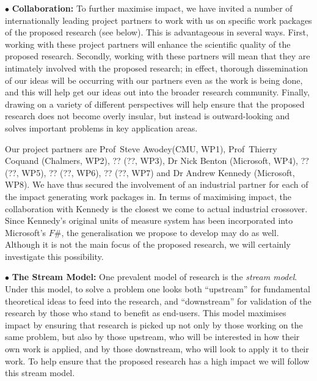 \documentclass[a4paper,11pt]{article}
\begin{document}

\vspace*{0.02in}

$\bullet$ {\bf Collaboration:} To further maximise impact, we have
invited a number of internationally leading project partners to work
with us on specific work packages of the proposed research (see
below). This is advantageous in several ways. First, working
with these project partners will enhance the scientific
quality of the proposed research. Secondly, working with these
partners will mean that they are intimately involved with the proposed
research; in effect, thorough dissemination of our ideas will be
occurring with our partners even as the work is being done, and this
will %
help get our ideas out into the broader
research community. Finally, drawing on a variety of different
perspectives will help ensure that the proposed research does not
become overly insular, but instead is outward-looking and
solves important problems in key application areas.



Our project partners are Prof~Steve Awodey(CMU, WP1), Prof~Thierry
Coquand (Chalmers, WP2), ?? (??, WP3), Dr Nick Benton (Microsoft,
WP4), ?? (??, WP5), ?? (??, WP6), ?? (??, WP7) and Dr Andrew Kennedy
(Microsoft, WP8). We have thus secured the involvement of an
industrial partner for each of the impact generating work packages
in. In terms of maximising impact, the collaboration with Kennedy is
the closest we come to actual industrial crossover. Since Kennedy's
original units of measure system has been incorporated into
Microsoft's $F\#$, the generalisation we propose to develop may do as
well. Although it is not the main focus of the proposed research, we
will certainly investigate this possibility. 



\vspace*{0.02in}

$\bullet$ {\bf The Stream Model:} One prevalent model of research is
the {\em stream model}. Under this model, to solve a problem one looks
both ``upstream'' for fundamental theoretical ideas to feed into the
research, and ``downstream'' for validation of the research by those
who stand to benefit as end-users. This model maximises impact by
ensuring that research is picked up not only by those working on the
same problem, but also by those upstream, who will be interested in
how their own work is applied, and by those downstream, who will look
to apply it to their work.  To help ensure that the proposed research
has a high impact we will follow this stream model.
\end{document}
